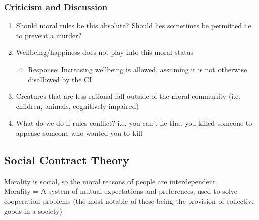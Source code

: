 \documentclass{article}
\begin{document}
        \subsubsection{Criticism and Discussion}
        \begin{enumerate}
            \item Should moral rules be this absolute? Should lies sometimes be permitted i.e. to prevent a murder?
            \item Wellbeing/happiness does not play into this moral status
            \begin{itemize}
                \item Response: Increasing wellbeing is allowed, assuming it is not otherwise disallowed by the CI.
            \end{itemize}{}
            \item Creatures that are less rational fall outside of the moral community (i.e. children, animals, cognitively impaired)
            \item What do we do if rules conflict? i.e. you can't lie that you killed someone to appease someone who wanted you to kill
        \end{enumerate}{}
    
    \subsection{Social Contract Theory}
    Morality is social, so the moral reasons of people are interdependent.
    \\Morality = A system of mutual expectations and preferences, used to solve cooperation problems (the most notable of these being the provision of collective goods in a society)
\end{document}

